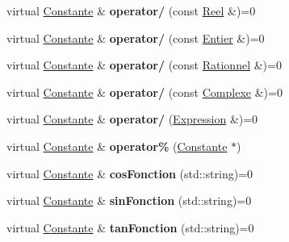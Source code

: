 \begin{DoxyCompactItemize}
\item 
\hypertarget{class_constante_a0355225f82499fabe7e64a5a09866fdb}{virtual \hyperlink{class_constante}{Constante} \& {\bfseries operator/} (const \hyperlink{class_reel}{Reel} \&)=0}\label{class_constante_a0355225f82499fabe7e64a5a09866fdb}

\item 
\hypertarget{class_constante_ac90f8c29c86fa9ccb15a44c64b14ee87}{virtual \hyperlink{class_constante}{Constante} \& {\bfseries operator/} (const \hyperlink{class_entier}{Entier} \&)=0}\label{class_constante_ac90f8c29c86fa9ccb15a44c64b14ee87}

\item 
\hypertarget{class_constante_a8c0dfdc199f6a8feff5038abf75c2b98}{virtual \hyperlink{class_constante}{Constante} \& {\bfseries operator/} (const \hyperlink{class_rationnel}{Rationnel} \&)=0}\label{class_constante_a8c0dfdc199f6a8feff5038abf75c2b98}

\item 
\hypertarget{class_constante_a5944c154c12015c0af36ef5fdb2e851b}{virtual \hyperlink{class_constante}{Constante} \& {\bfseries operator/} (const \hyperlink{class_complexe}{Complexe} \&)=0}\label{class_constante_a5944c154c12015c0af36ef5fdb2e851b}

\item 
\hypertarget{class_constante_a2c2e07511d0e5883ef337351b2121606}{virtual \hyperlink{class_constante}{Constante} \& {\bfseries operator/} (\hyperlink{class_expression}{Expression} \&)=0}\label{class_constante_a2c2e07511d0e5883ef337351b2121606}

\item 
\hypertarget{class_constante_a9234f524cc1b97560236afe686c4767a}{virtual \hyperlink{class_constante}{Constante} \& {\bfseries operator\%} (\hyperlink{class_constante}{Constante} $\ast$)}\label{class_constante_a9234f524cc1b97560236afe686c4767a}

\item 
\hypertarget{class_constante_a62ac7c7b4f04706ef930728736ee45ae}{virtual \hyperlink{class_constante}{Constante} \& {\bfseries cos\-Fonction} (std\-::string)=0}\label{class_constante_a62ac7c7b4f04706ef930728736ee45ae}

\item 
\hypertarget{class_constante_adf047fc87a4bc192ca159ad1711effb2}{virtual \hyperlink{class_constante}{Constante} \& {\bfseries sin\-Fonction} (std\-::string)=0}\label{class_constante_adf047fc87a4bc192ca159ad1711effb2}

\item 
\hypertarget{class_constante_ac527584889c9865e0dc80e4c22f6fc73}{virtual \hyperlink{class_constante}{Constante} \& {\bfseries tan\-Fonction} (std\-::string)=0}\label{class_constante_ac527584889c9865e0dc80e4c22f6fc73}


\end{DoxyCompactItemize}
